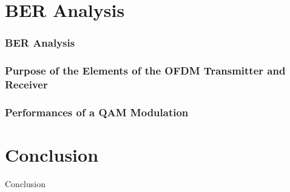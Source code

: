\documentclass{article}
\numberwithin{figure}{section}
\numberwithin{equation}{section}
\begin{document}
\part{BER Analysis}

\section{BER Analysis}

\section{Purpose of the Elements of the OFDM Transmitter and Receiver}

\section{Performances of a QAM Modulation}

\part{Conclusion}
Conclusion




\end{document}
